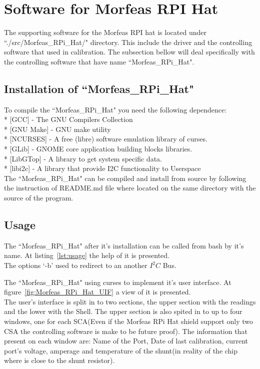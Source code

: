 \section{Software for Morfeas RPI Hat}
The supporting software for the Morfeas RPI hat is located under ``./src/Morfeas\_RPi\_Hat/" directory. This include the driver and the controlling software that used in calibration.
The subsection bellow will deal specifically with the controlling software that have name ``Morfeas\_RPi\_Hat".

\subsection{Installation of ``Morfeas\_RPi\_Hat"}
To compile the ``Morfeas\_RPi\_Hat" you need the following dependence:\\
* [GCC] - The GNU Compilers Collection\\
* [GNU Make] - GNU make utility\\
* [NCURSES] - A free (libre) software emulation library of curses.\\
* [GLib] - GNOME core application building blocks libraries.\\
* [LibGTop] - A library to get system specific data.\\
* [libi2c] - A library that provide I2C functionality to Userspace\\

The ``Morfeas\_RPi\_Hat" can be compiled and install from source by following the instruction of README.md file where located on the same directory with the source of the program.

\subsection{Usage}
The ``Morfeas\_RPi\_Hat" after it's installation can be called from bash by it's name. At listing~\ref{lst:usage} the help of it is presented.\\
The options `-b' used to redirect to an another $I^2C$ Bus.

The ``Morfeas\_RPi\_Hat" using curses to implement it's user interface. At figure~\ref{fig:Morfeas_RPi_Hat_UIF} a view of it is presented.\\
The user's interface is split in to two sections, the upper section with the readings and the lower with the Shell. 
The upper section is also spited in to up to four windows, one for each SCA(Even if the Morfeas RPi Hat shield support only two CSA the controlling software is make to be future proof).
The information that present on each window are: Name of the Port, Date of last calibration, current port's voltage, amperage and temperature of the shunt(in reality of the chip where is close to the shunt resistor).\\

